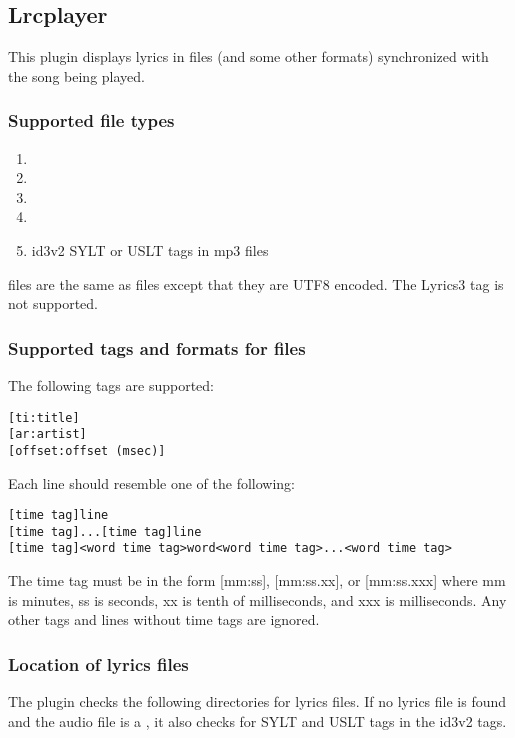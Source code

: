 \subsection{Lrcplayer}
This plugin displays lyrics in  files (and some other formats)
synchronized with the song being played.

\subsubsection{Supported file types}
\begin{enumerate}
\item {}
\item {}
\item {}
\item {}
\item id3v2 SYLT or USLT tags in mp3 files
\end{enumerate}

 files are the same as  files except that they are UTF8
encoded. The Lyrics3 tag is not supported.

\subsubsection{Supported tags and formats for  files}
The following tags are supported:
\begin{verbatim}
[ti:title]
[ar:artist]
[offset:offset (msec)]
\end{verbatim}

Each line should resemble one of the following:
\begin{verbatim}
[time tag]line
[time tag]...[time tag]line
[time tag]<word time tag>word<word time tag>...<word time tag>
\end{verbatim}

The time tag must be in the form [mm:ss], [mm:ss.xx], or [mm:ss.xxx] where mm is
minutes, ss is seconds, xx is tenth of milliseconds, and xxx is milliseconds.
Any other tags and lines without time tags are ignored.

\subsubsection{Location of lyrics files}
The plugin checks the following directories for lyrics files.
If no lyrics file is found and the audio file is a ,
it also checks for SYLT and USLT tags in the id3v2 tags.


